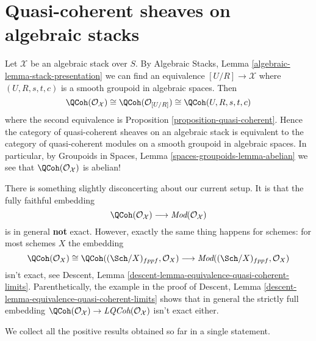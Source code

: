 \section{Quasi-coherent sheaves on algebraic stacks}
\label{section-quasi-coherent-algebraic-stacks}

\noindent
Let $\mathcal{X}$ be an algebraic stack over $S$. By
Algebraic Stacks, Lemma \ref{algebraic-lemma-stack-presentation}
we can find an equivalence $[U/R] \to \mathcal{X}$
where $(U, R, s, t, c)$ is a smooth groupoid in algebraic spaces.
Then
$$
\QCoh(\mathcal{O}_\mathcal{X})
\cong
\QCoh(\mathcal{O}_{[U/R]})
\cong
\QCoh(U, R, s, t, c)
$$
where the second equivalence is
Proposition \ref{proposition-quasi-coherent}.
Hence the category of quasi-coherent sheaves on an algebraic stack
is equivalent to the category of quasi-coherent modules on a smooth
groupoid in algebraic spaces. In particular, by
Groupoids in Spaces, Lemma \ref{spaces-groupoids-lemma-abelian}
we see that $\QCoh(\mathcal{O}_\mathcal{X})$ is abelian!

\medskip\noindent
There is something slightly disconcerting about our current setup.
It is that the fully faithful embedding
$$
\QCoh(\mathcal{O}_\mathcal{X})
\longrightarrow
\textit{Mod}(\mathcal{O}_\mathcal{X})
$$
is in general {\bf not} exact. However, exactly the same thing happens
for schemes: for most schemes $X$ the embedding
$$
\QCoh(\mathcal{O}_X) \cong
\QCoh((\Sch/X)_{fppf}, \mathcal{O}_X) \longrightarrow
\textit{Mod}((\Sch/X)_{fppf}, \mathcal{O}_X)
$$
isn't exact, see
Descent, Lemma \ref{descent-lemma-equivalence-quasi-coherent-limits}.
Parenthetically, the example in the proof of
Descent, Lemma \ref{descent-lemma-equivalence-quasi-coherent-limits}
shows that in general the strictly full embedding
$\QCoh(\mathcal{O}_\mathcal{X}) \to
\textit{LQCoh}(\mathcal{O}_\mathcal{X})$ isn't exact either.

\medskip\noindent
We collect all the positive results obtained so far in a single statement.

